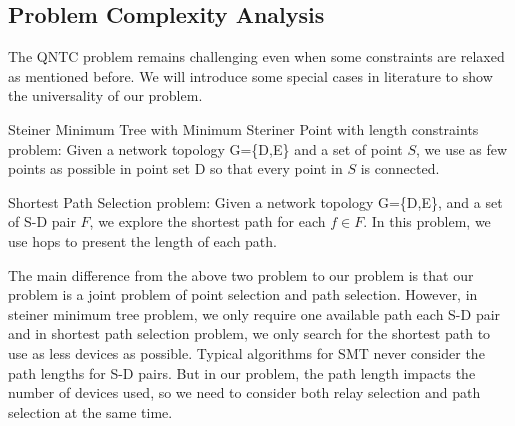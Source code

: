 %

\subsection{Problem Complexity Analysis}
The QNTC problem remains challenging even when some constraints are relaxed as mentioned before. We will introduce some special cases in literature to show the universality of our problem.


Steiner Minimum Tree with Minimum Steriner Point with length constraints problem: Given a network topology G=\{D,E\} and a set of point $S$, we use as few points as possible in point set D so that every point in $S$ is connected.

Shortest Path Selection problem: Given a network topology G=\{D,E\}, and a set of S-D pair $F$, we explore the shortest path for each $f \in F$. In this problem, we use hops to present the length of each path.

The main difference from the above two problem to our problem is that our problem is a joint problem of point selection and path selection. However, in steiner minimum tree problem, we only require one available path each S-D pair and in shortest path selection problem, we only search for the shortest path to use as less devices as possible. Typical algorithms for SMT never consider the path lengths for S-D pairs. But in our problem, the path length impacts the number of devices used, so we need to consider both relay selection and path selection at the same time.

